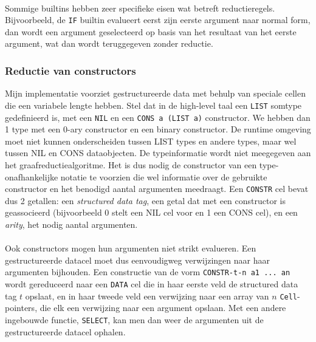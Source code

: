 \documentclass[a4paper,10pt]{article}
\begin{document}
\paragraph{}
Sommige builtins hebben zeer specifieke eisen wat betreft reductieregels.
Bijvoorbeeld, de \texttt{IF} builtin evalueert eerst zijn eerste argument naar normal form, dan wordt een argument geselecteerd op basis van het resultaat van het eerste argument, wat dan wordt teruggegeven zonder reductie.

\subsubsection{Reductie van constructors}
Mijn implementatie voorziet gestructureerde data met behulp van speciale cellen die een variabele lengte hebben.
Stel dat in de high-level taal een \texttt{LIST} somtype gedefinieerd is, met een \texttt{NIL} en een \texttt{CONS a (LIST a)} constructor.
We hebben dan 1 type met een 0-ary constructor en een binary constructor.
De runtime omgeving moet niet kunnen onderscheiden tussen LIST types en andere types, maar wel tussen NIL en CONS dataobjecten.
De typeinformatie wordt niet meegegeven aan het graafreductiealgoritme.
Het is dus nodig de constructor van een type-onafhankelijke notatie te voorzien die wel informatie over de gebruikte constructor en het benodigd aantal argumenten meedraagt.
Een \texttt{CONSTR} cel bevat dus 2 getallen: een \emph{structured data tag}, een getal dat met een constructor is geassocieerd (bijvoorbeeld 0 stelt een NIL cel voor en 1 een CONS cel), en een \emph{arity}, het nodig aantal argumenten.
\paragraph{}
Ook constructors mogen hun argumenten niet strikt evalueren.
Een gestructureerde datacel moet dus eenvoudigweg verwijzingen naar haar argumenten bijhouden.
Een constructie van de vorm \texttt{CONSTR-t-n a1 ... an} wordt gereduceerd naar een \texttt{DATA} cel die in haar eerste veld de structured data tag $t$ opslaat, en in haar tweede veld een verwijzing naar een array van $n$ \texttt{Cell}-pointers, die elk een verwijzing naar een argument opslaan.
Met een andere ingebouwde functie, \texttt{SELECT}, kan men dan weer de argumenten uit de gestructureerde datacel ophalen.
\end{document}
